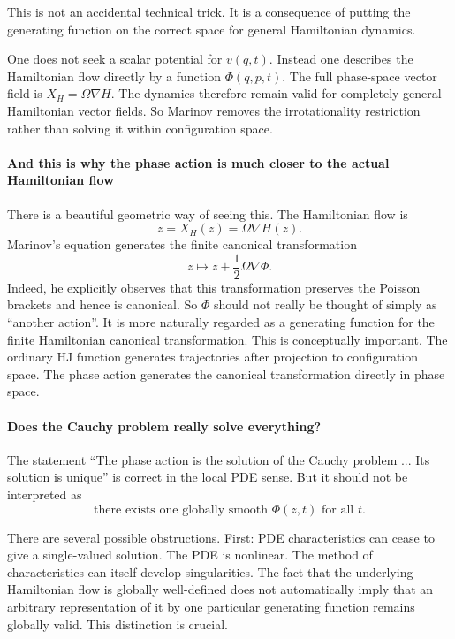 This is not an accidental technical trick. It is a consequence of putting the
generating function on the correct space for general Hamiltonian dynamics.

One does not seek a scalar potential for \(v(q,t)\).
Instead one describes the Hamiltonian flow directly by a function
$ \Phi(q,p,t)$.
The full phase-space vector field is
$ X_H=\Omega\nabla H $.
The dynamics therefore remain valid for completely general Hamiltonian vector
fields.
So Marinov removes the irrotationality restriction rather than solving it
within configuration space.

\paragraph{ And this is why the phase action is much closer to the actual Hamiltonian flow}
There is a beautiful geometric way of seeing this.
The Hamiltonian flow is
$$ \dot z=X_H(z)=\Omega\nabla H(z). $$
Marinov's equation generates the finite canonical transformation
$$ z\longmapsto z+\frac12\Omega\nabla\Phi. $$
Indeed, he explicitly observes that this transformation preserves the Poisson
brackets and hence is canonical.
So \(\Phi\) should not really be thought of simply as “another action”.
It is more naturally regarded as a generating function for the finite
Hamiltonian canonical transformation.
This is conceptually important.
The ordinary HJ function generates trajectories after projection to
configuration space.
The phase action generates the canonical transformation directly in phase
space.

\paragraph{ Does the Cauchy problem really solve everything?}
The statement “The phase action is the solution of the Cauchy problem ... 
Its solution is unique” is correct in the local PDE sense.
But it should not be interpreted as
$$ \boxed{\text{there exists one globally smooth }\Phi(z,t)\text{ for all }t.} $$

There are several possible obstructions.
First: PDE characteristics can cease to give a single-valued solution.
The PDE is nonlinear. The method of characteristics can itself develop
singularities.
The fact that the underlying Hamiltonian flow is globally well-defined does not
automatically imply that an arbitrary representation of it by one particular
generating function remains globally valid.
This distinction is crucial.

